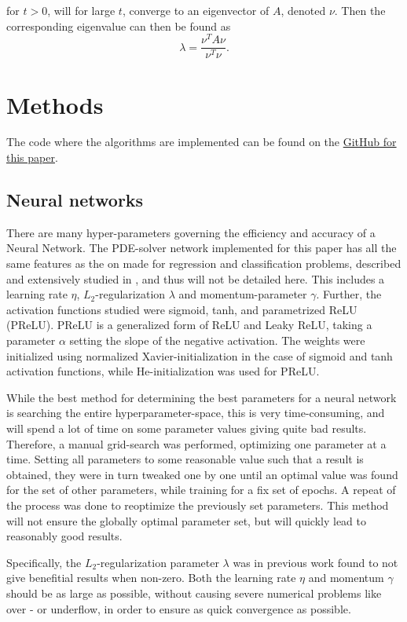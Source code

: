 \documentclass[multicolumn, 10pt]{extarticle}
\begin{document}
for $t>0$, will for large $t$, converge to an eigenvector of $A$, denoted $\nu$. Then the corresponding eigenvalue can then be found as
\begin{equation}
	\lambda = \frac{\nu^TA\nu}{\nu^T\nu}.
\end{equation}


\section{Methods}
The code where the algorithms are implemented can be found on the \href{https://github.com/SaraPJensen/FYS-STK/tree/main/Project3/code}{GitHub for this paper}.

\subsection{Neural networks}
There are many hyper-parameters governing the efficiency and accuracy of a Neural Network. The PDE-solver network implemented for this paper has all the same features as the on made for regression and classification problems, described and extensively studied in \cite{p2HO}, and thus will not be detailed here. This includes a learning rate $\eta$, $L_2$-regularization $\lambda$ and momentum-parameter $\gamma$. Further, the activation functions studied were sigmoid, tanh, and parametrized ReLU (PReLU). PReLU is a generalized form of ReLU and Leaky ReLU, taking a parameter $\alpha$ setting the slope of the negative activation. The weights were initialized using normalized Xavier-initialization in the case of sigmoid and tanh activation functions, while He-initialization was used for PReLU.


While the best method for determining the best parameters for a neural network is searching the entire hyperparameter-space, this is very time-consuming, and will spend a lot of time on some parameter values giving quite bad results. Therefore, a manual grid-search was performed, optimizing one parameter at a time. Setting all parameters to some reasonable value such that a result is obtained, they were in turn tweaked one by one until an optimal value was found for the set of other parameters, while training for a fix set of epochs. A repeat of the process was done to reoptimize the previously set parameters. This method will not ensure the globally optimal parameter set, but will quickly lead to reasonably good results.

Specifically, the $L_2$-regularization parameter $\lambda$ was in previous work found to not give benefitial results when non-zero. Both the learning rate $\eta$ and momentum $\gamma$ should be as large as possible, without causing severe numerical problems like over - or underflow, in order to ensure as quick convergence as possible.
\end{document}
